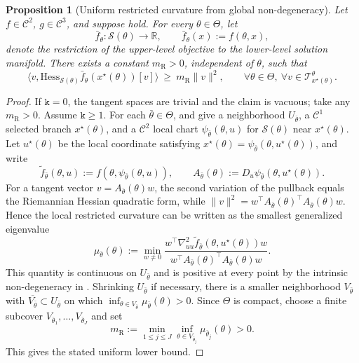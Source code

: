 \documentclass{article}
\theoremstyle{normaltheorem}
\newtheorem{proposition}[proposition]{Proposition}
\newcommand{\dimk}{\texttt{k}}
\newcommand{\R}{\mathbb{R}}
\newcommand{\calS}{\mathcal{S}}
\newcommand{\calT}{\mathcal{T}}
\begin{document}
\begin{proposition}[Uniform restricted curvature from global non-degeneracy]\label{prop:uniform-riem-nondeg}
Let \(f\in\mathcal{C}^{2}\), \(g\in\mathcal{C}^{3}\), and suppose  hold.
For every \(\theta\in\Theta\), let
\[
\bar f_\theta:\calS(\theta)\to\R,
\qquad
\bar f_\theta(x):=f(\theta,x),
\]
denote the restriction of the upper-level objective to the lower-level solution manifold.
There exists a constant \(m_{\mathrm R}>0\), independent of \(\theta\), such that
\[
\big\langle v,\mathrm{Hess}_{\calS(\theta)}\bar f_\theta(x^\star(\theta))[v]\big\rangle
\ \ge\
m_{\mathrm R}\|v\|^2,
\qquad
\forall \theta\in\Theta,\ \forall v\in\calT_{x^\star(\theta)}^\theta .
\]
\end{proposition}
\begin{proof}
If \(\dimk=0\), the tangent spaces are trivial and the claim is vacuous; take any \(m_{\mathrm R}>0\).
Assume \(\dimk\ge1\). For each \(\bar\theta\in\Theta\), \Cref{thm_hyp_obj_diff} and  give a
neighborhood \(U_{\bar\theta}\), a \(\mathcal{C}^{1}\) selected branch \(x^\star(\theta)\), and a \(\mathcal{C}^{2}\) local chart
\(\psi_{\bar\theta}(\theta,u)\) for \(\calS(\theta)\) near \(x^\star(\theta)\). Let \(u^\star(\theta)\) be the local
coordinate satisfying \(x^\star(\theta)=\psi_{\bar\theta}(\theta,u^\star(\theta))\), and write
\[
\tilde f_{\bar\theta}(\theta,u):=f(\theta,\psi_{\bar\theta}(\theta,u)),
\qquad
A_{\bar\theta}(\theta):=D_u\psi_{\bar\theta}(\theta,u^\star(\theta)).
\]
For a tangent vector \(v=A_{\bar\theta}(\theta)w\), the second variation of the pullback equals the Riemannian Hessian
quadratic form, while \(\|v\|^2=w^\top A_{\bar\theta}(\theta)^\top A_{\bar\theta}(\theta)w\). Hence the local restricted
curvature can be written as the smallest generalized eigenvalue
\[
\mu_{\bar\theta}(\theta):=
\min_{w\neq0}
\frac{w^\top\nabla^2_{uu}\tilde f_{\bar\theta}(\theta,u^\star(\theta))w}
     {w^\top A_{\bar\theta}(\theta)^\top A_{\bar\theta}(\theta)w}.
\]
This quantity is continuous on \(U_{\bar\theta}\) and is positive at every point by the intrinsic non-degeneracy in
\Cref{ass:unique_min}. Shrinking \(U_{\bar\theta}\) if necessary, there is a smaller neighborhood
\(V_{\bar\theta}\) with \(\overline{V_{\bar\theta}}\subset U_{\bar\theta}\) on which
\(\inf_{\theta\in V_{\bar\theta}}\mu_{\bar\theta}(\theta)>0\).
Since \(\Theta\) is compact, choose a finite subcover \(V_{\bar\theta_1},\ldots,V_{\bar\theta_J}\) and set
\[
m_{\mathrm R}:=\min_{1\le j\le J}\inf_{\theta\in V_{\bar\theta_j}}\mu_{\bar\theta_j}(\theta)>0.
\]
This gives the stated uniform lower bound.
\end{proof}
\end{document}
